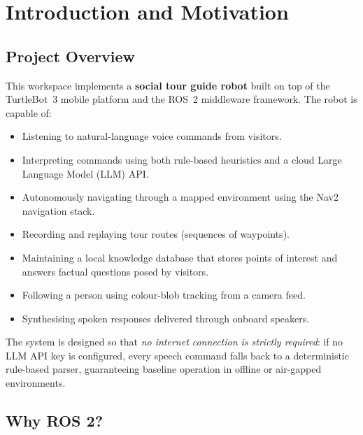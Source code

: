 \documentclass[12pt,a4paper]{report}
\newcommand{\kw}[1]{\textbf{#1}}
\begin{document}
\tableofcontents
\clearpage

\chapter{Introduction and Motivation}
\label{ch:intro}

\section{Project Overview}

This workspace implements a \kw{social tour guide robot} built on top of the
TurtleBot~3 mobile platform and the ROS~2 middleware framework.  The robot is
capable of:

\begin{itemize}[leftmargin=2em]
  \item Listening to natural-language voice commands from visitors.
  \item Interpreting commands using both rule-based heuristics and a cloud
        Large Language Model (LLM) API.
  \item Autonomously navigating through a mapped environment using the
        Nav2 navigation stack.
  \item Recording and replaying tour routes (sequences of waypoints).
  \item Maintaining a local knowledge database that stores points of interest
        and answers factual questions posed by visitors.
  \item Following a person using colour-blob tracking from a camera feed.
  \item Synthesising spoken responses delivered through onboard speakers.
\end{itemize}

The system is designed so that \emph{no internet connection is strictly
required}: if no LLM API key is configured, every speech command falls back to
a deterministic rule-based parser, guaranteeing baseline operation in
offline or air-gapped environments.

\section{Why ROS 2?}
\end{document}
